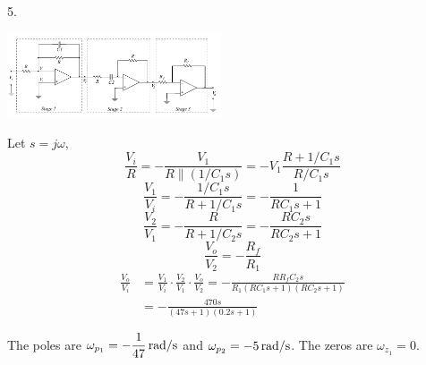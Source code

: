 \documentclass[landscape,a4paper]{article}
\newcommand{\unit}[1]{{\rm\,#1}}
\begin{document}
\begin{multicols}{3}
5.
\begin{center}
\includegraphics[height=2.5cm]{7.3.png}
\end{center}
Let $s=j\omega$,
$$\frac{V_i}{R}=-\frac{V_1}{R\parallel(1/C_1s)}=-V_1\frac{R+1/C_1s}{R/C_1s}$$
$$\frac{V_1}{V_i}=-\frac{1/C_1s}{R+1/C_1s}=-\frac{1}{RC_1s+1}$$
$$\frac{V_2}{V_1}=-\frac{R}{R+1/C_2s}=-\frac{RC_2s}{RC_2s+1}$$
$$\frac{V_o}{V_2}=-\frac{R_f}{R_1}$$
$$\begin{aligned}\frac{V_o}{V_i}&=\frac{V_1}{V_i}\cdot\frac{V_2}{V_1}\cdot\frac{V_o}{V_2}=-\frac{RR_fC_2s}{R_1(RC_1s+1)(RC_2s+1)}\\&=-\frac{470s}{(47s+1)(0.2s+1)}\end{aligned}$$

The poles are $\omega_{p_1}=-\dfrac{1}{47}\unit{rad/s}$ and $\omega_{p_2}=-5\unit{rad/s}$. The zeros are $\omega_{z_1}=0$.

\end{multicols}
\end{document}
